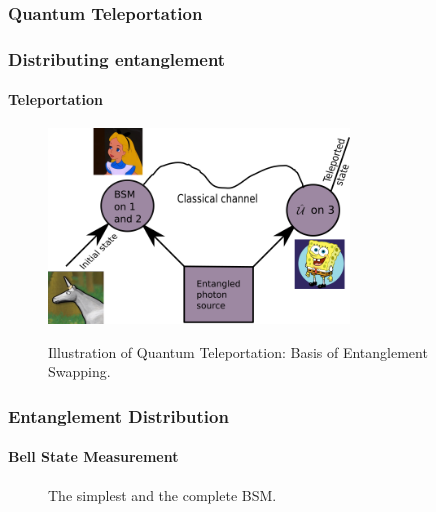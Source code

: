 \documentclass[serif,8pt]{beamer}
\begin{document}
\subsubsection{Quantum Teleportation}
\begin{frame}[t]
    \frametitle{Distributing entanglement}
    \framesubtitle{Teleportation}
    \begin{figure}[]
      \centering
      \caption{Illustration of Quantum Teleportation: Basis of Entanglement Swapping.}
      \includegraphics[width=8cm]{EntanglementTeleportation.png}
	\label{fig:Tele}
    \end{figure}
\end{frame}

\begin{frame}[t]
	\frametitle{Entanglement Distribution}
	\framesubtitle{Bell State Measurement}
	\begin{figure}
		\begin{center}
			\quad
		\end{center}
		\caption{The simplest and the complete BSM.}
		\label{fig:BSMSimple}
	\end{figure}
\end{frame}
\end{document}
